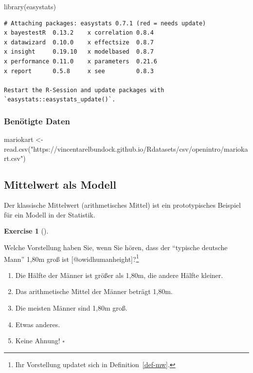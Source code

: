 \documentclass[
  letterpaper,
  DIV=11,
  numbers=noendperiod]{scrartcl}
\newenvironment{Shaded}{\begin{snugshade}}{\end{snugshade}}
\newcommand{\FunctionTok}[1]{\textcolor[rgb]{0.28,0.35,0.67}{#1}}
\newcommand{\NormalTok}[1]{\textcolor[rgb]{0.00,0.23,0.31}{#1}}
\newcommand{\OtherTok}[1]{\textcolor[rgb]{0.00,0.23,0.31}{#1}}
\newcommand{\StringTok}[1]{\textcolor[rgb]{0.13,0.47,0.30}{#1}}
\providecommand{\tightlist}{%
  \setlength{\itemsep}{0pt}\setlength{\parskip}{0pt}}\usepackage{longtable,booktabs,array}
\theoremstyle{definition}
\theoremstyle{definition}
\newtheorem{exercise}{Exercise}[section]
\theoremstyle{definition}
\theoremstyle{remark}
\begin{document}
\begin{Shaded}
\begin{Highlighting}[]
\FunctionTok{library}\NormalTok{(easystats)}
\end{Highlighting}
\end{Shaded}

\begin{verbatim}
# Attaching packages: easystats 0.7.1 (red = needs update)
x bayestestR  0.13.2    x correlation 0.8.4  
x datawizard  0.10.0    x effectsize  0.8.7  
x insight     0.19.10   x modelbased  0.8.7  
x performance 0.11.0    x parameters  0.21.6 
x report      0.5.8     x see         0.8.3  

Restart the R-Session and update packages with `easystats::easystats_update()`.
\end{verbatim}

\subsubsection{Benötigte Daten}\label{benuxf6tigte-daten}

\begin{Shaded}
\begin{Highlighting}[]
\NormalTok{mariokart }\OtherTok{\textless{}{-}} \FunctionTok{read.csv}\NormalTok{(}\StringTok{"https://vincentarelbundock.github.io/Rdatasets/csv/openintro/mariokart.csv"}\NormalTok{)}
\end{Highlighting}
\end{Shaded}

\subsection{Mittelwert als Modell}\label{sec-mw}

Der klassische Mittelwert (arithmetisches Mittel) ist ein prototypisches
Beispiel für ein Modell in der Statistik.

\begin{exercise}[]\protect\hypertarget{exr-mw-md-mod}{}\label{exr-mw-md-mod}

Welche Vorstellung haben Sie, wenn Sie hören, dass der ``typische
deutsche Mann'' 1,80m groß ist {[}@owidhumanheight{]}?\footnote{Ihr
  Vorstellung updatet sich in Definition~\ref{def-mw}.}

\begin{enumerate}
\def\labelenumi{\alph{enumi})}
\tightlist
\item
  Die Hälfte der Männer ist größer als 1,80m, die andere Hälfte kleiner.
\item
  Das arithmetische Mittel der Männer beträgt 1,80m.
\item
  Die meisten Männer sind 1,80m groß.
\item
  Etwas anderes.
\item
  Keine Ahnung! \(\square\)
\end{enumerate}

\end{exercise}
\end{document}
